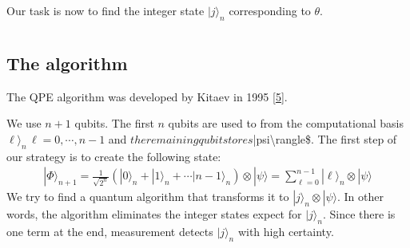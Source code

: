 \documentclass[letterpaper,10pt,english]{jupyterBook}
\begin{document}
\sphinxAtStartPar
Our task is now to find the integer state \(|j\rangle_n\) corresponding to \(\theta\).


\section{}
\label{\detokenize{algorithms/qpe:id1}}

\subsection{The algorithm}
\label{\detokenize{algorithms/qpe:the-algorithm}}
\sphinxAtStartPar
The QPE algorithm was developed by Kitaev in 1995 {[}\hyperlink{cite.references:id18}{5}{]}.

\sphinxAtStartPar
We use \(n+1\) qubits.  The first \(n\) qubits are used to from  the computational basis \(\ell\rangle_n\, \ell=0,\cdots, n-1\) and \(the remaining qubit stores \)|psi\textbackslash{}rangle\$.
The first step of our strategy is to create the following state:
\begin{equation}\label{equation:algorithms/qpe:qpe-step1}
\begin{split}
|\Phi\rangle_{n+1} = \frac{1}{\sqrt{2^n}} \left (|0\rangle_n  + |1\rangle_n + \cdots |n-1\rangle_n \right) \otimes |\psi\rangle = \sum_{\ell=0}^{n-1} |\ell\rangle_n \otimes |\psi\rangle
\end{split}
\end{equation}
\sphinxAtStartPar
We try to find a quantum algorithm that transforms it to \(|j\rangle_n \otimes |\psi\rangle\).  In other words, the algorithm eliminates the integer states expect for \(|j\rangle_n\).  Since there is one term at the end, measurement detects \(|j\rangle_n\) with high certainty.
\end{document}
